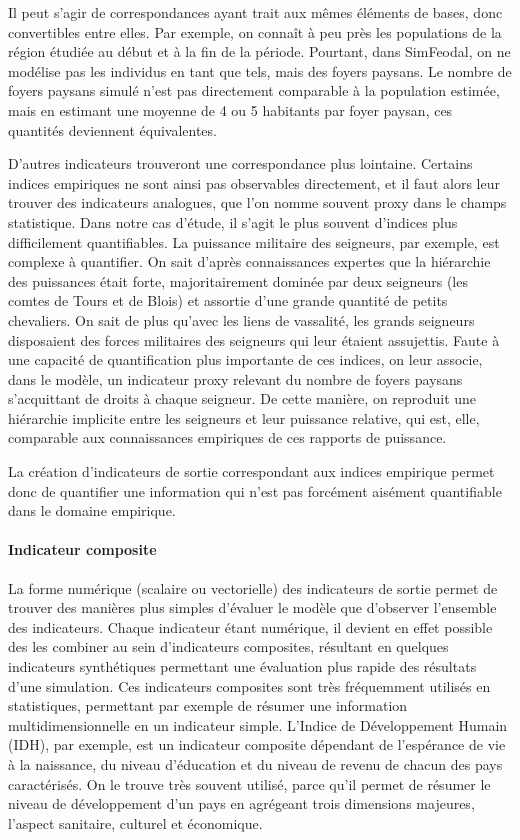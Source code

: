 Il peut s'agir de correspondances ayant trait aux mêmes éléments de bases, donc \og convertibles\fg{} entre elles.
Par exemple, on connaît à peu près les populations de la région étudiée au début et à la fin de la période.
Pourtant, dans SimFeodal, on ne modélise pas les individus en tant que tels, mais des foyers paysans.
Le nombre de foyers paysans simulé n'est pas directement comparable à la population estimée, mais en estimant une moyenne de 4 ou 5 habitants par foyer paysan, ces quantités deviennent équivalentes.

D'autres indicateurs trouveront une correspondance plus lointaine.
Certains indices empiriques ne sont ainsi pas observables directement, et il faut alors leur trouver des indicateurs analogues, que l'on nomme souvent \og proxy\fg{} dans le champs statistique.
Dans notre cas d'étude, il s'agit le plus souvent d'indices plus difficilement quantifiables.
La puissance militaire des seigneurs, par exemple, est complexe à quantifier.
On sait d'après connaissances expertes que la hiérarchie des puissances était forte, majoritairement dominée par deux seigneurs (les comtes de Tours et de Blois) et assortie d'une grande quantité de petits chevaliers.
On sait de plus qu'avec les liens de vassalité, les grands seigneurs disposaient des forces militaires des seigneurs qui leur étaient assujettis.
Faute à une capacité de quantification plus importante de ces indices, on leur associe, dans le modèle, un indicateur proxy relevant du nombre de foyers paysans s'acquittant de droits à chaque seigneur.
De cette manière, on reproduit une hiérarchie implicite entre les seigneurs et leur puissance relative, qui est, elle, comparable aux connaissances empiriques de ces rapports de puissance.

La création d'indicateurs de sortie correspondant aux indices empirique permet donc de quantifier une information qui n'est pas forcément aisément quantifiable dans le domaine empirique.

\paragraph{Indicateur composite}

La forme numérique (scalaire ou vectorielle) des indicateurs de sortie permet de trouver des manières plus simples d'évaluer le modèle que d'observer l'ensemble des indicateurs.
Chaque indicateur étant numérique, il devient en effet possible des les combiner au sein d'indicateurs composites, résultant en quelques indicateurs synthétiques permettant une évaluation plus rapide des résultats d'une simulation.
Ces indicateurs composites sont très fréquemment utilisés en statistiques, permettant par exemple de résumer une information multidimensionnelle en un indicateur simple.
L'Indice de Développement Humain (IDH), par exemple, est un indicateur composite dépendant de l'espérance de vie à la naissance, du niveau d'éducation et du niveau de revenu de chacun des pays caractérisés.
On le trouve très souvent utilisé, parce qu'il permet de résumer le niveau de développement d'un pays en agrégeant trois dimensions majeures, l'aspect sanitaire, culturel et économique.

